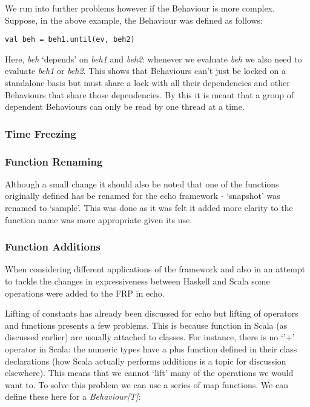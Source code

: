 \documentclass[12pt]{article}
\begin{document}
        We run into further problems however if the Behaviour is more complex. Suppose, in the above example,
        the Behaviour was defined as follows:

\begin{verbatim}
val beh = beh1.until(ev, beh2)
\end{verbatim}        

        Here, \emph{beh} `depends' on \emph{beh1} and \emph{beh2}: whenever we evaluate \emph{beh}
        we also need to evaluate \emph{beh1} or \emph{beh2}. This shows that Behaviours can't just
        be locked on a standalone basis but must share a lock with all their dependencies and other Behaviours
        that share those dependencies. By this it is meant that a group of dependent Behaviours can
        only be read by one thread at a time.
        
      \subsubsection{Time Freezing}
      
      \subsubsection{Function Renaming}
        Although a small change it should also be noted that one of the functions originally defined
        has be renamed for the echo framework - `snapshot' was renamed to `sample'. This was done as
        it was felt it added more clarity to the function name was more appropriate given its use.
        
      \subsubsection{Function Additions}
        When considering different applications of the framework and also in an attempt to
        tackle the changes in expressiveness between Haskell and Scala some operations
        were added to the FRP in echo.
        
        Lifting of constants has already been discussed for echo but lifting of operators and
        functions presents a few problems. This is because function in Scala (as discussed earlier)
        are usually attached to classes. For instance, there is no `'+' operator in Scala: the numeric
        types have a plus function defined in their class declarations (how Scala actually performs additions
        is a topic for discussion elsewhere). This means that we cannot `lift' many of the operations we
        would want to. To solve this problem we can use a series of map functions. We can define these
        here for a \emph{Behaviour[T]}:
\end{document}
